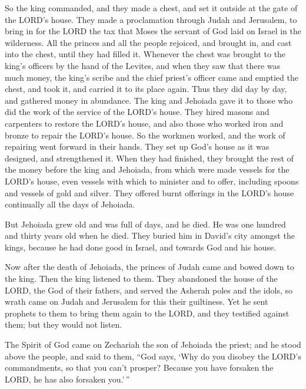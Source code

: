  So the king commanded, and they made a chest, and set it
outside at the gate of the LORD's house.  They made a
proclamation through Judah and Jerusalem, to bring in for the LORD the
tax that Moses the servant of God laid on Israel in the wilderness.
 All the princes and all the people rejoiced, and brought
in, and cast into the chest, until they had filled it. 
Whenever the chest was brought to the king's officers by the hand of the
Levites, and when they saw that there was much money, the king's scribe
and the chief priest's officer came and emptied the chest, and took it,
and carried it to its place again. Thus they did day by day, and
gathered money in abundance.  The king and Jehoiada gave
it to those who did the work of the service of the LORD's house. They
hired masons and carpenters to restore the LORD's house, and also those
who worked iron and bronze to repair the LORD's house. 
So the workmen worked, and the work of repairing went forward in their
hands. They set up God's house as it was designed, and strengthened it.
 When they had finished, they brought the rest of the
money before the king and Jehoiada, from which were made vessels for the
LORD's house, even vessels with which to minister and to offer,
including spoons and vessels of gold and silver. They offered burnt
offerings in the LORD's house continually all the days of Jehoiada.

 But Jehoiada grew old and was full of days, and he died.
He was one hundred and thirty years old when he died. 
They buried him in David's city amongst the kings, because he had done
good in Israel, and towards God and his house.

 Now after the death of Jehoiada, the princes of Judah
came and bowed down to the king. Then the king listened to them.
 They abandoned the house of the LORD, the God of their
fathers, and served the Asherah poles and the idols, so wrath came on
Judah and Jerusalem for this their guiltiness.  Yet he
sent prophets to them to bring them again to the LORD, and they
testified against them; but they would not listen.

 The Spirit of God came on Zechariah the son of Jehoiada
the priest; and he stood above the people, and said to them, ``God says,
`Why do you disobey the LORD's commandments, so that you can't prosper?
Because you have forsaken the LORD, he has also forsaken you.'\,''


